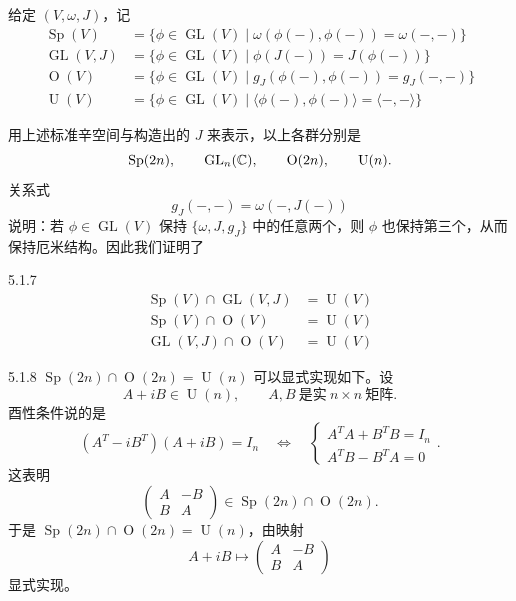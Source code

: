 给定 $(V,\omega,J)$，记
\begin{align*}
\operatorname{Sp}(V)&=\{\phi\in\operatorname{GL}(V)\mid \omega(\phi(-),\phi(-))=\omega(-,-)\}\\
\operatorname{GL}(V,J)&=\{\phi\in\operatorname{GL}(V)\mid \phi(J(-))=J(\phi(-))\}\\
\operatorname{O}(V)&=\{\phi\in\operatorname{GL}(V)\mid g_J(\phi(-),\phi(-))=g_J(-,-)\}\\
\operatorname{U}(V)&=\{\phi\in\operatorname{GL}(V)\mid \langle\phi(-),\phi(-)\rangle=\langle-,-\rangle\}
\end{align*}


用上述标准辛空间与构造出的 $J$ 来表示，以上各群分别是
\[
\operatorname{Sp}(2n),\qquad \operatorname{GL}_n(\mathbb{C}),\qquad \operatorname{O}(2n),\qquad \operatorname{U}(n).
\]
关系式
\[
g_J(-,-)=\omega(-,J(-))
\]
说明：若 $\phi\in\operatorname{GL}(V)$ 保持 $\{\omega,J,g_J\}$ 中的任意两个，则 $\phi$ 也保持第三个，从而保持厄米结构。因此我们证明了

\begin{proposition}{5.1.7}
\[
\begin{aligned}
\operatorname{Sp}(V)\cap\operatorname{GL}(V,J)&=\operatorname{U}(V)\\
\operatorname{Sp}(V)\cap\operatorname{O}(V)&=\operatorname{U}(V)\\
\operatorname{GL}(V,J)\cap\operatorname{O}(V)&=\operatorname{U}(V)
\end{aligned}
\]
\end{proposition}

\begin{example}{5.1.8}
$\operatorname{Sp}(2n)\cap\operatorname{O}(2n)=\operatorname{U}(n)$ 可以显式实现如下。设
\[
A+iB\in\operatorname{U}(n),\qquad A,B\ \text{是实}\ n\times n\ \text{矩阵}.
\]
酉性条件说的是
\[
(A^T-iB^T)(A+iB)=I_n
\quad\Longleftrightarrow\quad
\begin{cases}
A^TA+B^TB=I_n\\[2pt]
A^TB-B^TA=0
\end{cases}.
\]
这表明
\[
\begin{pmatrix}A&-B\\B&A\end{pmatrix}\in\operatorname{Sp}(2n)\cap\operatorname{O}(2n).
\]
于是 $\operatorname{Sp}(2n)\cap\operatorname{O}(2n)=\operatorname{U}(n)$，由映射
\[
A+iB\longmapsto\begin{pmatrix}A&-B\\B&A\end{pmatrix}
\]
显式实现。
\end{example}


